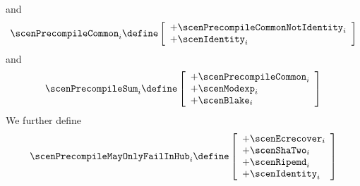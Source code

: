 and
\[
	\scenPrecompileCommon _{i}
	\define
	\left[ \begin{array}{l}
		+ \scenPrecompileCommonNotIdentity _{i} \\
		+ \scenIdentity                    _{i} \\
	\end{array} \right]
\]
and
\[
	\scenPrecompileSum_{i}
	\define
	\left[ \begin{array}{l}
		+ \scenPrecompileCommon _{i} \\
		+ \scenModexp           _{i} \\
		+ \scenBlake            _{i} \\
	\end{array} \right]
\]
We further define
\[
	\scenPrecompileMayOnlyFailInHub _{i}
	\define
	\left[ \begin{array}{l}
		+ \scenEcrecover _{i} \\
		+ \scenShaTwo    _{i} \\
		+ \scenRipemd    _{i} \\
		+ \scenIdentity  _{i} \\
	\end{array} \right]
\]
